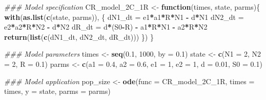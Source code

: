 \documentclass[
]{book}
\newenvironment{Shaded}{\begin{snugshade}}{\end{snugshade}}
\newcommand{\CommentTok}[1]{\textcolor[rgb]{0.56,0.35,0.01}{\textit{#1}}}
\newcommand{\ControlFlowTok}[1]{\textcolor[rgb]{0.13,0.29,0.53}{\textbf{#1}}}
\newcommand{\DataTypeTok}[1]{\textcolor[rgb]{0.13,0.29,0.53}{#1}}
\newcommand{\DecValTok}[1]{\textcolor[rgb]{0.00,0.00,0.81}{#1}}
\newcommand{\FloatTok}[1]{\textcolor[rgb]{0.00,0.00,0.81}{#1}}
\newcommand{\KeywordTok}[1]{\textcolor[rgb]{0.13,0.29,0.53}{\textbf{#1}}}
\newcommand{\NormalTok}[1]{#1}
\newcommand{\OperatorTok}[1]{\textcolor[rgb]{0.81,0.36,0.00}{\textbf{#1}}}
\newcommand{\StringTok}[1]{\textcolor[rgb]{0.31,0.60,0.02}{#1}}
\begin{document}
\begin{Shaded}
\begin{Highlighting}[]
\CommentTok{### Model specification}
\NormalTok{CR_model_2C_1R <-}\StringTok{ }\ControlFlowTok{function}\NormalTok{(times, state, parms)\{}
  \KeywordTok{with}\NormalTok{(}\KeywordTok{as.list}\NormalTok{(}\KeywordTok{c}\NormalTok{(state, parms)), \{}
\NormalTok{    dN1_dt =}\StringTok{ }\NormalTok{e1}\OperatorTok{*}\NormalTok{a1}\OperatorTok{*}\NormalTok{R}\OperatorTok{*}\NormalTok{N1 }\OperatorTok{-}\StringTok{ }\NormalTok{d}\OperatorTok{*}\NormalTok{N1}
\NormalTok{    dN2_dt =}\StringTok{ }\NormalTok{e2}\OperatorTok{*}\NormalTok{a2}\OperatorTok{*}\NormalTok{R}\OperatorTok{*}\NormalTok{N2 }\OperatorTok{-}\StringTok{ }\NormalTok{d}\OperatorTok{*}\NormalTok{N2}
\NormalTok{    dR_dt =}\StringTok{  }\NormalTok{d}\OperatorTok{*}\NormalTok{(S0}\OperatorTok{-}\NormalTok{R) }\OperatorTok{-}\StringTok{ }\NormalTok{a1}\OperatorTok{*}\NormalTok{R}\OperatorTok{*}\NormalTok{N1 }\OperatorTok{-}\StringTok{ }\NormalTok{a2}\OperatorTok{*}\NormalTok{R}\OperatorTok{*}\NormalTok{N2}
    \KeywordTok{return}\NormalTok{(}\KeywordTok{list}\NormalTok{(}\KeywordTok{c}\NormalTok{(dN1_dt, dN2_dt, dR_dt)))}
\NormalTok{  \})}
\NormalTok{\}}

\CommentTok{### Model parameters}
\NormalTok{times <-}\StringTok{ }\KeywordTok{seq}\NormalTok{(}\FloatTok{0.1}\NormalTok{, }\DecValTok{1000}\NormalTok{, }\DataTypeTok{by =} \FloatTok{0.1}\NormalTok{)  }
\NormalTok{state <-}\StringTok{ }\KeywordTok{c}\NormalTok{(}\DataTypeTok{N1 =} \DecValTok{2}\NormalTok{, }\DataTypeTok{N2 =} \DecValTok{2}\NormalTok{, }\DataTypeTok{R =} \FloatTok{0.1}\NormalTok{)  }
\NormalTok{parms <-}\StringTok{ }\KeywordTok{c}\NormalTok{(}\DataTypeTok{a1 =} \FloatTok{0.4}\NormalTok{, }\DataTypeTok{a2 =} \FloatTok{0.6}\NormalTok{, }\DataTypeTok{e1 =} \DecValTok{1}\NormalTok{, }\DataTypeTok{e2 =} \DecValTok{1}\NormalTok{, }\DataTypeTok{d =} \FloatTok{0.01}\NormalTok{, }\DataTypeTok{S0 =} \FloatTok{0.1}\NormalTok{)}

\CommentTok{### Model application}
\NormalTok{pop_size <-}\StringTok{ }\KeywordTok{ode}\NormalTok{(}\DataTypeTok{func =}\NormalTok{ CR_model_2C_1R, }\DataTypeTok{times =}\NormalTok{ times, }\DataTypeTok{y =}\NormalTok{ state, }\DataTypeTok{parms =}\NormalTok{ parms)}


\end{Highlighting}
\end{Shaded}
\end{document}
